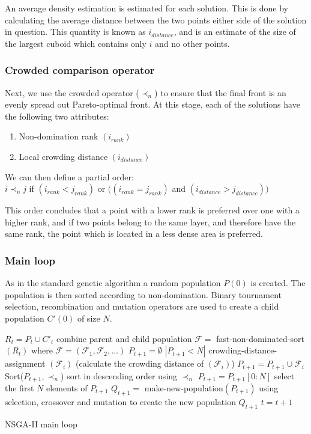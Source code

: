 \documentclass[10pt, conference, compsocconf]{IEEEtran}
\begin{document}
An average density estimation is estimated for each solution. This is done by calculating the average distance between the two points either side of the solution in question. This quantity is known as $i_{distance}$, and is an estimate of the size of the largest cuboid which contains only $i$ and no other points. 

\subsubsection{Crowded comparison operator}

Next, we use the crowded operator ($\prec_n$) to ensure that the final front is an evenly spread out Pareto-optimal front. At this stage, each of the solutions have the following two attributes:
\begin{enumerate}
  \item Non-domination rank $(i_{rank})$
  \item Local crowding distance $(i_{distance})$
\end{enumerate}

We can then define a partial order:\\
$i\prec_nj$ if $(i_{rank}<j_{rank})$ or $((i_{rank}=j_{rank})$ and $(i_{distance}>j_{distance}))$ \cite{Valkanas2014}

This order concludes that a point with a lower rank is preferred over one with a higher rank, and if two points belong to the same layer, and therefore have the same rank, the point which is located in a less dense area is preferred.


\subsubsection{Main loop}

As in the standard genetic algorithm a random population $P(0)$ is created. The population is then  sorted according to non-domination. Binary tournament selection, recombination and mutation operators are used to create a child population $C'(0)$ of size $N$. 



\begin{algorithm}
\begin{algorithmic}[1]
\State $R_t=P_t \cup C'_t$ combine parent and child population
\State $\mathcal{F} = $ fast-non-dominated-sort $(R_t)$ where $\mathcal{F}=(\mathcal{F}_1, \mathcal{F}_2,\ldots)$
\State $P_{t+1}=\emptyset$
\While $\left|P_{t+1}<N\right|$
\State crowding-distance-assignment $(\mathcal{F}_i)$ (calculate the crowding distance of $(\mathcal{F}_i)$)
\State $P_{t+1}=P_{t+1}\cup \mathcal{F}_i$
\EndWhile
\State Sort($P_{t+1}, \prec_n$) sort in descending order using $\prec_n$
\State $P_{t+1} = P_{t+1}[0:N]$ select the first $N$ elements of $P_{t+1}$
\State $Q_{t+1} = $ make-new-population$(P_{t+1})$ using selection, crossover and mutation to create the new population $Q_{t+1}$
\State $t=t+1$
\caption{NSGA-II main loop \cite{Valkanas2014}}
\label{algo:nsga2}
\end{algorithmic}
\end{algorithm}
\end{document}
